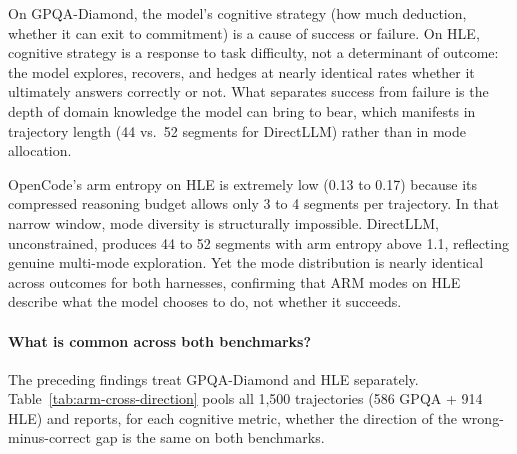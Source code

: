 
On GPQA-Diamond, the model's cognitive strategy (how much deduction, whether
it can exit to commitment) is a cause of success or failure.
On HLE, cognitive strategy is a response to task difficulty, not a
determinant of outcome: the model explores, recovers, and hedges at nearly
identical rates whether it ultimately answers correctly or not.
What separates success from failure is the depth of domain knowledge the
model can bring to bear, which manifests in trajectory length (44 vs.\ 52
segments for DirectLLM) rather than in mode allocation.

OpenCode's arm entropy on HLE is extremely low (0.13 to 0.17) because its
compressed reasoning budget allows only 3 to 4 segments per trajectory.
In that narrow window, mode diversity is structurally impossible.
DirectLLM, unconstrained, produces 44 to 52 segments with arm entropy above
1.1, reflecting genuine multi-mode exploration.
Yet the mode distribution is nearly identical across outcomes for both
harnesses, confirming that ARM modes on HLE describe what the model chooses
to do, not whether it succeeds.

\paragraph{What is common across both benchmarks?}

The preceding findings treat GPQA-Diamond and HLE separately.
Table~\ref{tab:arm-cross-direction} pools all 1,500 trajectories (586 GPQA
+ 914 HLE) and reports, for each cognitive metric, whether the direction of
the wrong-minus-correct gap is the same on both benchmarks.

